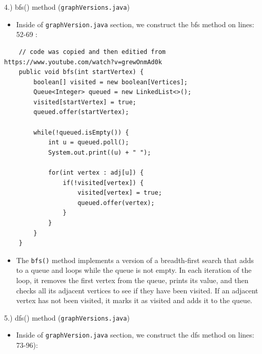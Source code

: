 \documentclass{article}
\begin{document}
\begin{large}
     4.) bfs() method (\verb|graphVersions.java|)
\end{large}

\begin{itemize}

\item Inside of \verb|graphVersion.java| section, we construct the bfs method on lines: 52-69 :

\end{itemize}

\begin{verbatim}
    // code was copied and then editied from https://www.youtube.com/watch?v=grewOnmAd0k
    public void bfs(int startVertex) {
        boolean[] visited = new boolean[Vertices];
        Queue<Integer> queued = new LinkedList<>();
        visited[startVertex] = true;
        queued.offer(startVertex);
    
        while(!queued.isEmpty()) {
            int u = queued.poll();
            System.out.print((u) + " ");
    
            for(int vertex : adj[u]) {
                if(!visited[vertex]) { 
                    visited[vertex] = true;
                    queued.offer(vertex);
                }
            }
        }
    }
\end{verbatim}

\begin{itemize}

\item The \verb|bfs()| method implements a version of a breadth-first search that adds to a queue and loops while the queue is not empty. In each iteration of the loop, it removes the first vertex from the queue, prints its value, and then checks all its adjacent vertices to see if they have been visited. If an adjacent vertex has not been visited, it marks it as visited and adds it to the queue.\\

\end{itemize}




\begin{large}
     5.) dfs() method (\verb|graphVersions.java|)
\end{large}

\begin{itemize}

\item Inside of \verb|graphVersion.java| section, we construct the dfs method on lines: 73-96):

\end{itemize}
\end{document}
